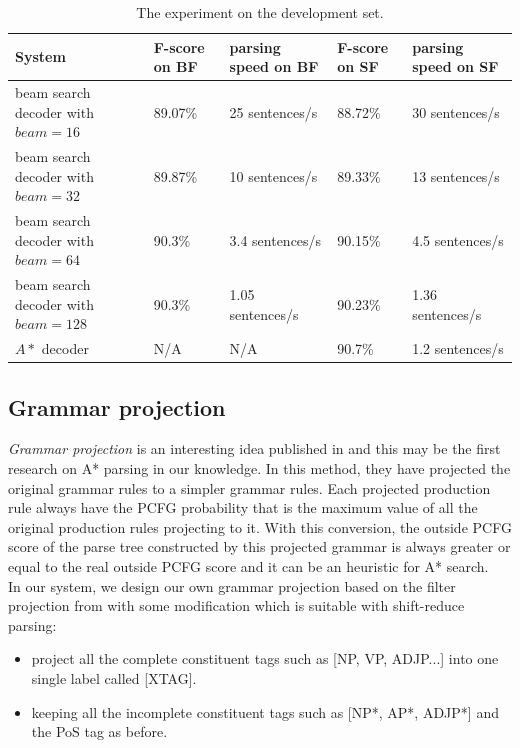 \begin{table}
	\begin{center}
		\caption{\label{first experiment} The experiment on the development set.}
		\begin{tabular}{|p{2cm}|p{3cm}|p{3cm}|p{3cm}|p{3cm}|}
			\hline 
			System & F-score on BF & parsing speed on BF & F-score on SF & parsing speed on SF \\ \hline
			beam search decoder with $beam = 16$ & 89.07\% & 25 sentences/s & 88.72\% & 30 sentences/s \\ \hline
			beam search decoder with $beam = 32$ & 89.87\% & 10 sentences/s & 89.33\% & 13 sentences/s \\ \hline	
			beam search decoder with $beam = 64$ & 90.3\% & 3.4 sentences/s & 90.15\% & 4.5 sentences/s \\ \hline
			beam search decoder with $beam = 128$ & 90.3\% & 1.05 sentences/s & 90.23\% & 1.36 sentences/s\\ \hline
			$A*$ decoder & N/A & N/A & 90.7\% & 1.2 sentences/s \\
			\hline
		\end{tabular}
	\end{center}
\end{table}


\subsection{Grammar projection}
\textit{Grammar projection} is an interesting idea published in \cite{2003DanNAACL} and this may be the first research on A* parsing in our knowledge. In this method, they have projected the original grammar rules to a simpler grammar rules. Each projected production rule always have the PCFG probability that is the maximum value of all the original production rules projecting to it. With this conversion, the outside PCFG score of the parse tree constructed by this projected grammar is always greater or equal to the real outside PCFG score and it can be an heuristic for A* search.\\
\indent In our system, we design our own grammar projection based on the filter projection from \cite{2003DanNAACL} with some modification which is suitable with shift-reduce parsing:
\begin{itemize}
	\item project all the complete constituent tags such as [NP, VP, ADJP...] into one single label called [XTAG].
	\item keeping all the incomplete constituent tags such as [NP*, AP*, ADJP*] and the PoS tag as before.
\end{itemize}

